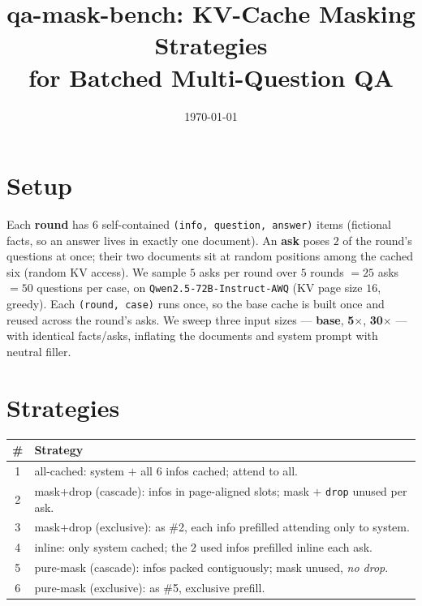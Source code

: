 \documentclass[11pt]{article}
\title{\textbf{qa-mask-bench}: KV-Cache Masking Strategies\\for Batched Multi-Question QA}
\date{\today}
\begin{document}
\maketitle

\section{Setup}
Each \textbf{round} has $6$ self-contained \texttt{(info, question, answer)}
items (fictional facts, so an answer lives in exactly one document). An
\textbf{ask} poses $2$ of the round's questions at once; their two documents sit
at random positions among the cached six (random KV access). We sample $5$ asks
per round over $5$ rounds $=25$ asks $=50$ questions per case, on
\texttt{Qwen2.5-72B-Instruct-AWQ} (KV page size $16$, greedy). Each
\texttt{(round, case)} runs once, so the base cache is built once and reused
across the round's asks. We sweep three input sizes --- \textbf{base},
\textbf{5$\times$}, \textbf{30$\times$} --- with identical facts/asks, inflating
the documents and system prompt with neutral filler.

\section{Strategies}
\begin{tabular}{@{}c l@{}}
\toprule
\# & Strategy \\
\midrule
1 & all-cached: system $+$ all $6$ infos cached; attend to all. \\
2 & mask+drop (cascade): infos in page-aligned slots; mask $+$ \texttt{drop} unused per ask. \\
3 & mask+drop (exclusive): as \#2, each info prefilled attending only to system. \\
4 & inline: only system cached; the $2$ used infos prefilled inline each ask. \\
5 & pure-mask (cascade): infos packed contiguously; mask unused, \emph{no drop}. \\
6 & pure-mask (exclusive): as \#5, exclusive prefill. \\
\bottomrule
\end{tabular}
\end{document}
